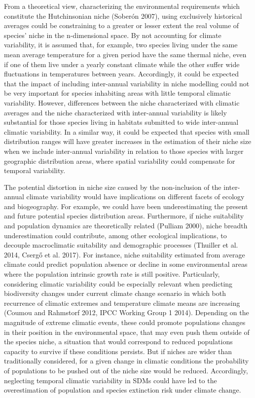 \documentclass[11pt,twoside]{reedthesis}
\begin{document}
From a theoretical view, characterizing the environmental requirements
which constitute the Hutchinsonian niche (Soberón 2007), using
exclusively historical averages could be constraining to a greater or
lesser extent the real volume of species' niche in the n-dimensional
space. By not accounting for climate variability, it is assumed that,
for example, two species living under the same mean average temperature
for a given period have the same thermal niche, even if one of them live
under a yearly constant climate while the other suffer wide fluctuations
in temperatures between years. Accordingly, it could be expected that
the impact of including inter-annual variability in niche modelling
could not be very important for species inhabiting areas with little
temporal climatic variability. However, differences between the niche
characterized with climatic averages and the niche characterized with
inter-annual variability is likely substantial for those species living
in habitats submitted to wide inter-annual climatic variability. In a
similar way, it could be expected that species with small distribution
ranges will have greater increases in the estimation of their niche size
when we include inter-annual variability in relation to those species
with larger geographic distribution areas, where spatial variability
could compensate for temporal variability.\par

The potential distortion in niche size caused by the non-inclusion of
the inter-annual climate variability would have implications on
different facets of ecology and biogeography. For example, we could have
been underestimating the present and future potential species
distribution areas. Furthermore, if niche suitability and population
dynamics are theoretically related (Pulliam 2000), niche breadth
underestimation could contribute, among other ecological implications,
to decouple macroclimatic suitability and demographic processes
(Thuiller et al. 2014, Csergő et al. 2017). For instance, niche
suitability estimated from average climate could predict population
absence or decline in some environmental areas where the population
intrinsic growth rate is still positive. Particularly, considering
climatic variability could be especially relevant when predicting
biodiversity changes under current climate change scenario in which both
recurrence of climatic extremes and temperature climate means are
increasing (Coumou and Rahmstorf 2012, IPCC Working Group 1 2014).
Depending on the magnitude of extreme climatic events, these could
promote populations changes in their position in the environmental
space, that may even push them outside of the species niche, a situation
that would correspond to reduced populations capacity to survive if
these conditions persists. But if niches are wider than traditionally
considered, for a given change in climatic conditions the probability of
populations to be pushed out of the niche size would be reduced.
Accordingly, neglecting temporal climatic variability in SDMs could have
led to the overestimation of population and species extinction risk
under climate change.\par
\end{document}
